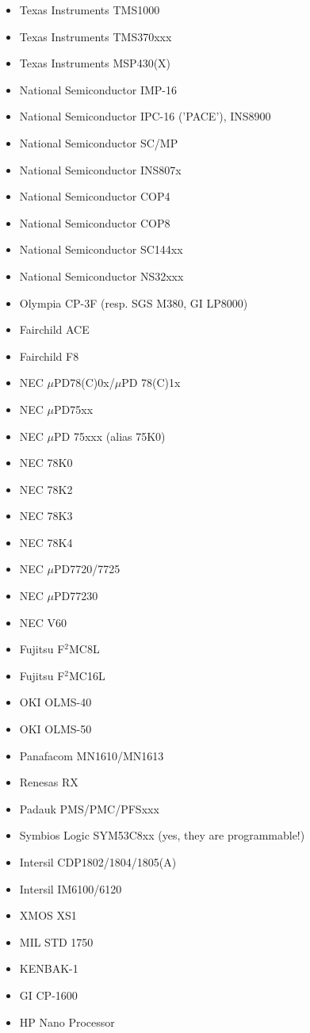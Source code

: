\documentclass[12pt,twoside]{report}
\begin{document}
\begin{itemize}
\item{Texas Instruments TMS1000}
\item{Texas Instruments TMS370xxx}
\item{Texas Instruments MSP430(X)}
\item{National Semiconductor IMP-16}
\item{National Semiconductor IPC-16 ('PACE'), INS8900}
\item{National Semiconductor SC/MP}
\item{National Semiconductor INS807x}
\item{National Semiconductor COP4}
\item{National Semiconductor COP8}
\item{National Semiconductor SC144xx}
\item{National Semiconductor NS32xxx}
\item{Olympia CP-3F (resp. SGS M380, GI LP8000)}
\item{Fairchild ACE}
\item{Fairchild F8}
\item{NEC $\mu$PD78(C)0x/$\mu$PD 78(C)1x}
\item{NEC $\mu$PD75xx}
\item{NEC $\mu$PD 75xxx (alias 75K0)}
\item{NEC 78K0}
\item{NEC 78K2}
\item{NEC 78K3}
\item{NEC 78K4}
\item{NEC $\mu$PD7720/7725}
\item{NEC $\mu$PD77230}
\item{NEC V60}
\item{Fujitsu F$^2$MC8L}
\item{Fujitsu F$^2$MC16L}
\item{OKI OLMS-40}
\item{OKI OLMS-50}
\item{Panafacom MN1610/MN1613}
\item{Renesas RX}
\item{Padauk PMS/PMC/PFSxxx}
\item{Symbios Logic SYM53C8xx (yes, they are programmable!)}
\item{Intersil CDP1802/1804/1805(A)}
\item{Intersil IM6100/6120}
\item{XMOS XS1}
\item{MIL STD 1750}
\item{KENBAK-1}
\item{GI CP-1600}
\item{HP Nano Processor}
\end{itemize}
\end{document}
